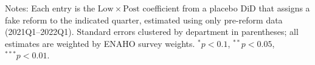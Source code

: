 \begin{table}[!tbp]\centering
\caption{In-time placebo reforms (pre-reform window only)}\label{tab:placebo}
\begin{threeparttable}

\begin{tablenotes}\footnotesize
\item Notes: Each entry is the $\mathrm{Low}\times\mathrm{Post}$ coefficient from a placebo
DiD that assigns a fake reform to the indicated quarter, estimated using only pre-reform
data (2021Q1--2022Q1). Standard errors clustered by department in parentheses; all estimates
are weighted by ENAHO survey weights. $^{*}p<0.1$, $^{**}p<0.05$, $^{***}p<0.01$.
\end{tablenotes}
\end{threeparttable}
\end{table}
